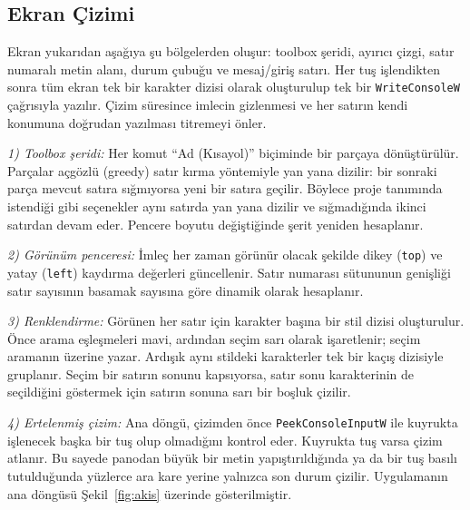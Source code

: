 \documentclass[conference,a4paper]{IEEEtran}
\newcommand{\kod}[1]{\texttt{#1}}
\begin{document}
\subsection{Ekran Çizimi}

Ekran yukarıdan aşağıya şu bölgelerden oluşur: toolbox şeridi, ayırıcı çizgi, satır numaralı metin alanı, durum çubuğu ve mesaj/giriş satırı. Her tuş işlendikten sonra tüm ekran tek bir karakter dizisi olarak oluşturulup tek bir \kod{WriteConsoleW} çağrısıyla yazılır. Çizim süresince imlecin gizlenmesi ve her satırın kendi konumuna doğrudan yazılması titremeyi önler.

\textit{1) Toolbox şeridi:} Her komut ``Ad (Kısayol)'' biçiminde bir parçaya dönüştürülür. Parçalar açgözlü (greedy) satır kırma yöntemiyle yan yana dizilir: bir sonraki parça mevcut satıra sığmıyorsa yeni bir satıra geçilir. Böylece proje tanımında istendiği gibi seçenekler aynı satırda yan yana dizilir ve sığmadığında ikinci satırdan devam eder. Pencere boyutu değiştiğinde şerit yeniden hesaplanır.

\textit{2) Görünüm penceresi:} İmleç her zaman görünür olacak şekilde dikey (\kod{top}) ve yatay (\kod{left}) kaydırma değerleri güncellenir. Satır numarası sütununun genişliği satır sayısının basamak sayısına göre dinamik olarak hesaplanır.

\textit{3) Renklendirme:} Görünen her satır için karakter başına bir stil dizisi oluşturulur. Önce arama eşleşmeleri mavi, ardından seçim sarı olarak işaretlenir; seçim aramanın üzerine yazar. Ardışık aynı stildeki karakterler tek bir kaçış dizisiyle gruplanır. Seçim bir satırın sonunu kapsıyorsa, satır sonu karakterinin de seçildiğini göstermek için satırın sonuna sarı bir boşluk çizilir.

\textit{4) Ertelenmiş çizim:} Ana döngü, çizimden önce \kod{PeekConsoleInputW} ile kuyrukta işlenecek başka bir tuş olup olmadığını kontrol eder. Kuyrukta tuş varsa çizim atlanır. Bu sayede panodan büyük bir metin yapıştırıldığında ya da bir tuş basılı tutulduğunda yüzlerce ara kare yerine yalnızca son durum çizilir. Uygulamanın ana döngüsü Şekil~\ref{fig:akis} üzerinde gösterilmiştir.
\end{document}
